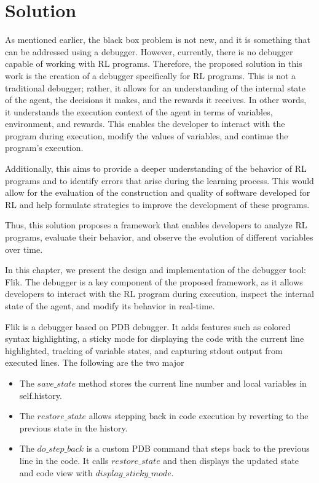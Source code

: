 
\chapter{Solution}
\label{cha:solution}

As mentioned earlier, the black box problem is not new, and it is something 
that can be addressed using a debugger. However, currently, there is no 
debugger capable of working with RL programs. Therefore, the proposed solution 
in this work is the creation of a debugger specifically for RL programs. This 
is not a traditional debugger; rather, it allows for an understanding of the 
internal state of the agent, the decisions it makes, and the rewards it 
receives. In other words, it understands the execution context of the agent 
in terms of variables, environment, and rewards. This enables the developer 
to interact with the program during execution, modify the values of variables, 
and continue the program's execution.

Additionally, this aims to provide a deeper understanding of the behavior of 
RL programs and to identify errors that arise during the learning process. 
This would allow for the evaluation of the construction and quality of 
software developed for RL and help formulate strategies to improve the 
development of these programs.

Thus, this solution proposes a framework that enables developers to 
analyze RL programs, evaluate their behavior, and observe the evolution 
of different variables over time.

In this chapter, we present the design and implementation of the debugger tool: \ac{Flik}.
The debugger is a key component of the proposed framework, as it allows 
developers to interact with the RL program during execution, inspect the 
internal state of the agent, and modify its behavior in real-time.

\ac{Flik} is a debugger based on \ac{PDB} debugger. It adds features such as colored syntax 
highlighting, a sticky mode for displaying the code with the current line highlighted, 
tracking of variable states, and capturing stdout output from executed lines. The 
following are the two major 
\begin{itemize}
    \item The $save\_state$ method stores the current line number and local variables in 
    self.history.
    \item The $restore\_state$ allows stepping back in code execution by reverting to the 
    previous state in the history.
    \item The $do\_step\_back$ is a custom PDB command that steps back to the previous line in 
    the code. It calls $restore\_state$ and then displays the updated state and code view with 
    $display\_sticky\_mode$.
\end{itemize}

